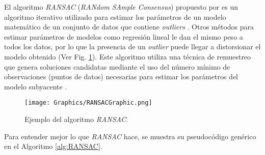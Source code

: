 El algoritmo \textit{RANSAC} (\textit{RANdom SAmple Consensus}) propuesto por \cite{FischlerBolles} es un algoritmo iterativo utilizado para estimar los parámetros de un modelo matemático de un conjunto de datos que contiene \textit{outliers} \cite{PabloJuan}. Otros métodos para estimar parámetros de modelos como regresión lineal le dan el mismo peso a todos los datos, por lo que la presencia de un \textit{outlier} puede llegar a distorsionar el modelo obtenido (Ver Fig. \ref{fig:RANSACExample}). Este algoritmo utiliza una técnica de remuestreo que genera soluciones candidatas mediante el uso del número mínimo de observaciones (puntos de datos) necesarias para estimar los parámetros del modelo subyacente \cite{Konstantinos}.

\begin{figure}[h!]
    \centering
    \texttt{[image: Graphics/RANSACGraphic.png]}
    \caption{Ejemplo del algoritmo \textit{RANSAC}.}
    \label{fig:RANSACExample}
\end{figure}

Para entender mejor lo que \textit{RANSAC} hace, se muestra su pseudocódigo genérico en el Algoritmo \ref{alg:RANSAC}.

